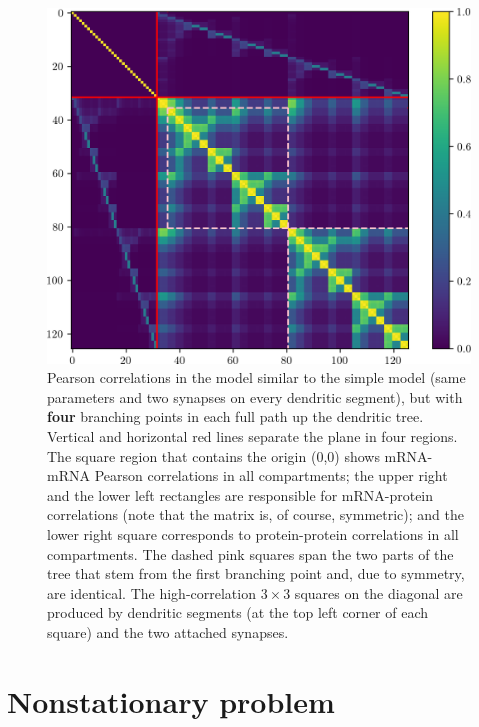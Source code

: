 \documentclass[a4paper, 11pt]{article}
\begin{document}
\begin{figure}
  \begin{center}
    \includegraphics[width=15cm]{img/4_forks_pearson_correlations.png}
  \end{center}
    \caption{Pearson correlations in the model similar to the simple model (same parameters and two synapses on every dendritic segment), but with {\bf four} branching points in each full path up the dendritic tree. Vertical and horizontal red lines separate the plane in four regions. The square region that contains the origin (0,0) shows mRNA-mRNA Pearson correlations in all compartments; the upper right and the lower left rectangles are responsible for mRNA-protein correlations (note that the matrix is, of course, symmetric); and the lower right square corresponds to protein-protein correlations in all compartments. The dashed pink squares span the two parts of the tree that stem from the first branching point and, due to symmetry, are identical. The high-correlation $3\times3$ squares on the diagonal are produced by dendritic segments (at the top left corner of each square) and the two attached synapses.}
  \label{fig:4_forks_pearson_correlations}
\end{figure}


\section{Nonstationary problem}
\end{document}
